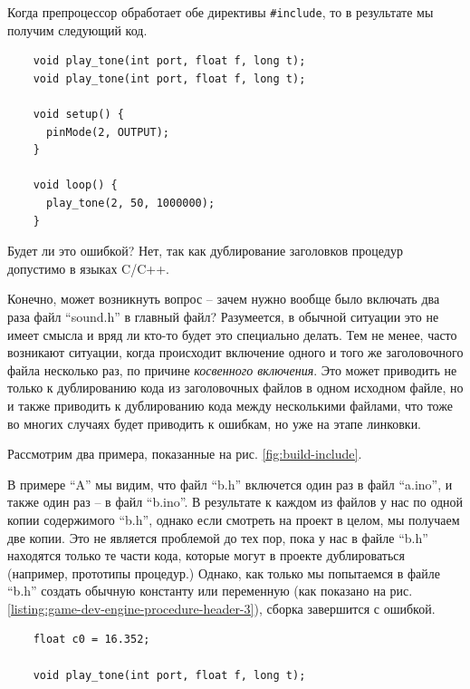 \documentclass[../sparc.tex]{subfiles}
\begin{document}
Когда препроцессор обработает обе директивы \texttt{#include}, то в
результате мы получим следующий код.

\begin{listing}[H]
  \begin{verbatim}
    void play_tone(int port, float f, long t);
    void play_tone(int port, float f, long t);

    void setup() {
      pinMode(2, OUTPUT);
    }

    void loop() {
      play_tone(2, 50, 1000000);
    }
  \end{verbatim}
  \label{listing:game-dev-engine-procedure-header-include-3}
  \caption{Результат работы препроцессора.}
\end{listing}

Будет ли это ошибкой?  Нет, так как дублирование заголовков процедур допустимо в
языках C/C++.

Конечно, может возникнуть вопрос -- зачем нужно вообще было включать два раза
файл ``sound.h'' в главный файл?  Разумеется, в обычной ситуации это не имеет
смысла и вряд ли кто-то будет это специально делать.  Тем не менее, часто
возникают ситуации, когда происходит включение одного и того же заголовочного
файла несколько раз, по причине \emph{косвенного включения}.  Это может
приводить не только к дублированию кода из заголовочных файлов в одном исходном
файле, но и также приводить к дублированию кода между несколькими файлами, что
тоже во многих случаях будет приводить к ошибкам, но уже на этапе линковки.

Рассмотрим два примера, показанные на рис. \ref{fig:build-include}.


В примере ``A'' мы видим, что файл ``b.h'' включется один раз в файл ``a.ino'',
и также один раз -- в файл ``b.ino''.  В результате к каждом из файлов у нас по
одной копии содержимого ``b.h'', однако если смотреть на проект в целом, мы
получаем две копии.  Это не является проблемой до тех пор, пока у нас в файле
``b.h'' находятся только те части кода, которые могут в проекте дублироваться
(например, прототипы процедур.)  Однако, как только мы попытаемся в файле
``b.h'' создать обычную константу или переменную (как показано на
рис. \ref{listing:game-dev-engine-procedure-header-3}), сборка завершится с
ошибкой.

\begin{listing}[H]
  \begin{verbatim}
    float c0 = 16.352;

    void play_tone(int port, float f, long t);
  \end{verbatim}
  \label{listing:game-dev-engine-procedure-header-3}
  \caption{Файл ``b.h'' с добавленной переменной.}
\end{listing}
\end{document}
